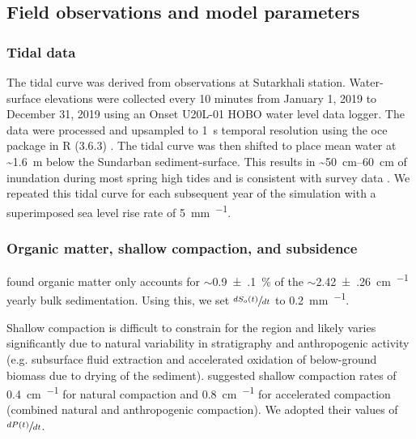 \subsection{Field observations and model parameters}

\bigskip

\subsubsection*{Tidal data}

The tidal curve was derived from observations at Sutarkhali station. Water-surface elevations were collected every 10 minutes from January 1, 2019 to December 31, 2019 using an Onset U20L-01 HOBO water level data logger. The data were processed and upsampled to \SI{1}{\second} temporal resolution using the oce package in R (3.6.3) \citep{kelleyOceAnalysisOceanographic2020}. The tidal curve was then shifted to place mean water at \SI{~1.6}{\meter} below the Sundarban sediment-surface. This results in \SIrange{~50}{60}{\centi\meter} of inundation during most spring high tides and is consistent with survey data \citep{auerbachFloodRiskNatural2015,haleSeasonalVariabilityForces2019,bomerSurfaceElevationSedimentation2020}. We repeated this tidal curve for each subsequent year of the simulation with a superimposed sea level rise rate of \SI{5}{\milli\meter\per\year}.

\subsubsection*{Organic matter, shallow compaction, and subsidence}

\citet{bomerProcessControlsLive2020} found organic matter only accounts for $\sim$\SI{0.9(1)}{\percent} of the $\sim$\SI{2.42(26)}{\centi\meter\per\year} yearly bulk sedimentation. Using this, we set $\sfrac{dS_o(t)}{dt}$ to \SI{0.2}{\milli\meter\per\year}.

Shallow compaction is difficult to constrain for the region and likely varies significantly due to natural variability in stratigraphy and anthropogenic activity (e.g. subsurface fluid extraction and accelerated oxidation of below-ground biomass due to drying of the sediment). \citet{auerbachFloodRiskNatural2015} suggested shallow compaction rates of \SI{0.4}{\centi\meter\per\year} for natural compaction and \SI{0.8}{\centi\meter\per\year} for accelerated compaction (combined natural and anthropogenic compaction). We adopted their values of $\sfrac{dP(t)}{dt}$.

